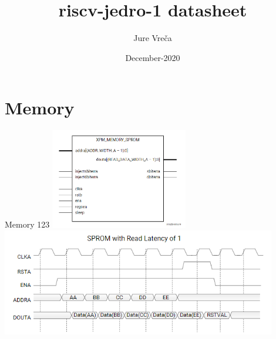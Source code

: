 \documentclass{report}
\title{riscv-jedro-1 datasheet}
\date{December-2020}
\author{Jure Vre\v{c}a}
\begin{document}
  \maketitle
  \newpage

  \chapter{Memory}
	Memory 123
	\includegraphics[width=6cm]{xpm_memory_sprom_if}
	\newline
	\includegraphics[width=12cm]{xpm_sprom_time_diagram}
\end{document}
